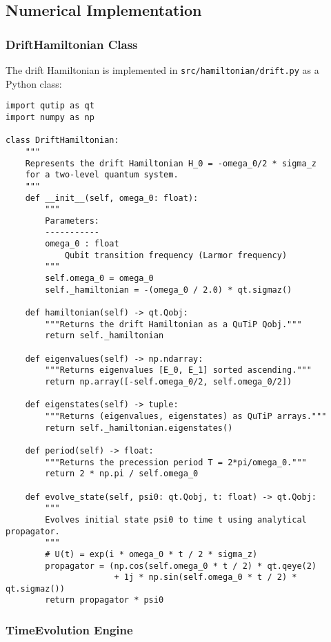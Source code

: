 \documentclass[11pt,a4paper]{article}
\theoremstyle{definition}
\theoremstyle{remark}
\begin{document}
\subsection{Numerical Implementation}

\subsubsection{DriftHamiltonian Class}

The drift Hamiltonian is implemented in \texttt{src/hamiltonian/drift.py} as a Python class:

\begin{lstlisting}[caption={Drift Hamiltonian class structure}]
import qutip as qt
import numpy as np

class DriftHamiltonian:
    """
    Represents the drift Hamiltonian H_0 = -omega_0/2 * sigma_z
    for a two-level quantum system.
    """
    def __init__(self, omega_0: float):
        """
        Parameters:
        -----------
        omega_0 : float
            Qubit transition frequency (Larmor frequency)
        """
        self.omega_0 = omega_0
        self._hamiltonian = -(omega_0 / 2.0) * qt.sigmaz()

    def hamiltonian(self) -> qt.Qobj:
        """Returns the drift Hamiltonian as a QuTiP Qobj."""
        return self._hamiltonian

    def eigenvalues(self) -> np.ndarray:
        """Returns eigenvalues [E_0, E_1] sorted ascending."""
        return np.array([-self.omega_0/2, self.omega_0/2])

    def eigenstates(self) -> tuple:
        """Returns (eigenvalues, eigenstates) as QuTiP arrays."""
        return self._hamiltonian.eigenstates()

    def period(self) -> float:
        """Returns the precession period T = 2*pi/omega_0."""
        return 2 * np.pi / self.omega_0

    def evolve_state(self, psi0: qt.Qobj, t: float) -> qt.Qobj:
        """
        Evolves initial state psi0 to time t using analytical propagator.
        """
        # U(t) = exp(i * omega_0 * t / 2 * sigma_z)
        propagator = (np.cos(self.omega_0 * t / 2) * qt.qeye(2)
                      + 1j * np.sin(self.omega_0 * t / 2) * qt.sigmaz())
        return propagator * psi0
\end{lstlisting}

\subsubsection{TimeEvolution Engine}
\end{document}
